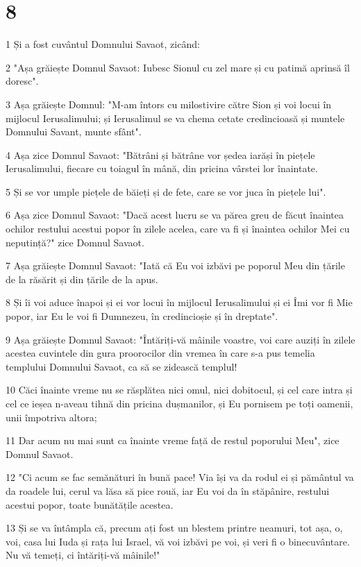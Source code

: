 \chapter{8}

\par 1 Și a fost cuvântul Domnului Savaot, zicând:
\par 2 "Așa grăiește Domnul Savaot: Iubesc Sionul cu zel mare și cu patimă aprinsă îl doresc".
\par 3 Așa grăiește Domnul: "M-am întors cu milostivire către Sion și voi locui în mijlocul Ierusalimului; și Ierusalimul se va chema cetate credincioasă și muntele Domnului Savant, munte sfânt".
\par 4 Așa zice Domnul Savaot: "Bătrâni și bătrâne vor ședea iarăși în piețele Ierusalimului, fiecare cu toiagul în mână, din pricina vârstei lor înaintate.
\par 5 Și se vor umple piețele de băieți și de fete, care se vor juca în piețele lui".
\par 6 Așa zice Domnul Savaot: "Dacă acest lucru se va părea greu de făcut înaintea ochilor restului acestui popor în zilele acelea, care va fi și înaintea ochilor Mei cu neputință?" zice Domnul Savaot.
\par 7 Așa grăiește Domnul Savaot: "Iată că Eu voi izbăvi pe poporul Meu din țările de la răsărit și din țările de la apus.
\par 8 Și îi voi aduce înapoi și ei vor locui în mijlocul Ierusalimului și ei Îmi vor fi Mie popor, iar Eu le voi fi Dumnezeu, în credincioșie și în dreptate".
\par 9 Așa grăiește Domnul Savaot: "Întăriți-vă mâinile voastre, voi care auziți în zilele acestea cuvintele din gura proorocilor din vremea în care s-a pus temelia templului Domnului Savaot, ca să se zidească templul!
\par 10 Căci înainte vreme nu se răsplătea nici omul, nici dobitocul, și cel care intra și cel ce ieșea n-aveau tihnă din pricina dușmanilor, și Eu pornisem pe toți oamenii, unii împotriva altora;
\par 11 Dar acum nu mai sunt ca înainte vreme față de restul poporului Meu", zice Domnul Savaot.
\par 12 "Ci acum se fac semănături în bună pace! Via își va da rodul ei și pământul va da roadele lui, cerul va lăsa să pice rouă, iar Eu voi da în stăpânire, restului acestui popor, toate bunătățile acestea.
\par 13 Și se va întâmpla că, precum ați fost un blestem printre neamuri, tot așa, o, voi, casa lui Iuda și rața lui Israel, vă voi izbăvi pe voi, și veri fi o binecuvântare. Nu vă temeți, ci întăriți-vă mâinile!"
